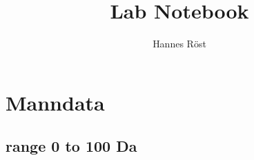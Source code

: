 

\usepackage{gensymb}
\usepackage{hyphenat}
\usepackage{subfig}



\author{Hannes Röst}
\title{Lab Notebook}
\maketitle

\tableofcontents

\section{Manndata}

\subsection{range 0 to 100 Da}


